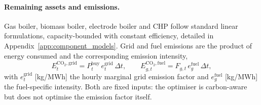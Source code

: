 \paragraph{Remaining assets and emissions.}
Gas boiler, biomass boiler, electrode boiler and CHP follow standard linear formulations,
capacity-bounded with constant efficiency, detailed in
Appendix~\ref{app:component_models}. Grid and fuel emissions are the product of energy
consumed and the corresponding emission intensity,
\begin{equation}
  E_t^{\mathrm{CO_2,grid}} =
    P_t^{\mathrm{buy}}\, e_t^{\mathrm{grid}}\, \Delta t,
  \qquad
  E_{g,t}^{\mathrm{CO_2,fuel}} =
    F_{g,t}\, e_g^{\mathrm{fuel}}\, \Delta t,
  \label{eq:emissions}
\end{equation}
with $e_t^{\mathrm{grid}}$ [kg/MWh] the hourly marginal grid emission factor and
$e_g^{\mathrm{fuel}}$ [kg/MWh] the fuel-specific intensity. Both are fixed inputs: the
optimiser is carbon-aware but does not optimise the emission factor itself.
